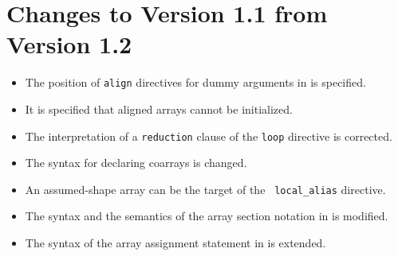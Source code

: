 \section{Changes to Version 1.1 from Version 1.2}

\begin{itemize}
  \item The position of {\tt align} directives for dummy arguments
		in {\XMPC} is specified.
  \item It is specified that aligned arrays cannot be initialized.
  \item The interpretation of a {\tt reduction} clause of the {\tt loop}
		directive is corrected.
  \item The syntax for declaring coarrays is changed.
  \item An assumed-shape array can be the target of the {\tt
		local\_alias} directive.
  \item The syntax and the semantics of the array section notation in
		{\XMPC} is modified.
  \item The syntax of the array assignment statement in {\XMPC} is
		extended.
\end{itemize}


\cleardoublepage

